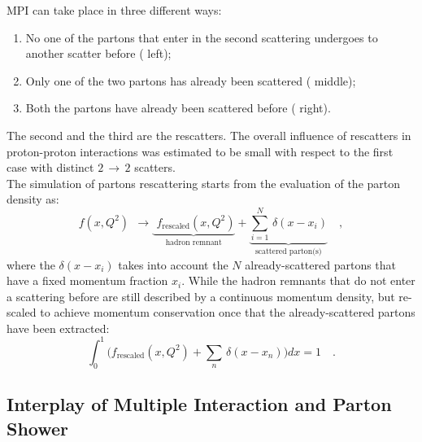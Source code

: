 \noindent MPI can take place in three different ways:
\begin{enumerate}
	\item No one of the partons that enter in the second scattering undergoes to another scatter before ( left);
	\item Only one of the two partons has already been scattered ( middle); 
	\item Both the partons have already been scattered before ( right). 
\end{enumerate}
The second and the third are the rescatters. The overall influence of rescatters in proton-proton interactions was estimated to be small with respect to the first case with distinct $2\,\rightarrow\,2$  scatters. 
\\
The simulation of partons rescattering starts from the evaluation of the parton density as:
\begin{equation}
	f(x,Q^2)\ \  \longrightarrow\! \underbrace{\phantom{\Bigg(} f_{\text{rescaled}}(x,Q^2)}_{\text{hadron remnant}}+\underbrace{\displaystyle\sum_{i=1}^N \,\delta(x-x_i)}_{\text{scattered parton(s)}}\quad,
\end{equation} 
where the $\delta(x-x_i)$ takes into account the $N$  already-scattered partons that have a fixed momentum fraction $x_i$. While the hadron remnants that do not enter a scattering before are still described by a continuous momentum density, but re-scaled to achieve momentum conservation once that the already-scattered partons have been extracted:
\begin{equation}	\displaystyle\int_0^1 \bigg( f_{\text{rescaled}}(x,Q^2) +\displaystyle\sum_n \,\delta(x-x_n) \bigg)dx=1\quad.
\end{equation}


\subsection{Interplay of Multiple Interaction and Parton Shower}

